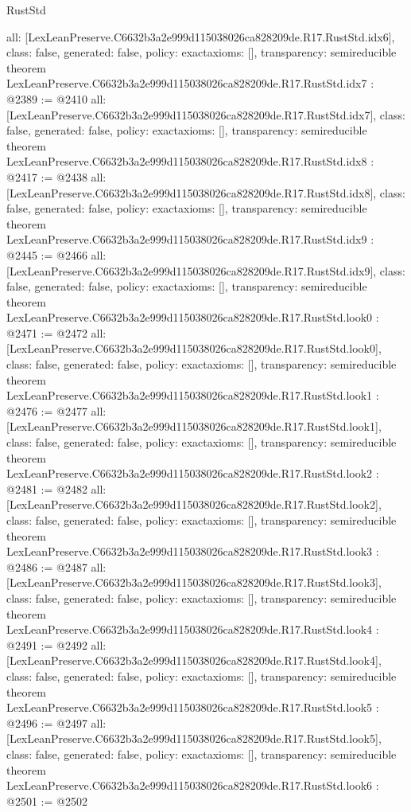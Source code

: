 \begin{lexlean}{RustStd}
\begin{coremodule}
{  all: [LexLeanPreserve.C6632b3a2e999d115038026ca828209de.R17.RustStd.idx6],
  class: false,
  generated: false,
  policy: exact{axioms: []},
  transparency: semireducible
}
theorem LexLeanPreserve.C6632b3a2e999d115038026ca828209de.R17.RustStd.idx7 : @2389 := @2410 {
  all: [LexLeanPreserve.C6632b3a2e999d115038026ca828209de.R17.RustStd.idx7],
  class: false,
  generated: false,
  policy: exact{axioms: []},
  transparency: semireducible
}
theorem LexLeanPreserve.C6632b3a2e999d115038026ca828209de.R17.RustStd.idx8 : @2417 := @2438 {
  all: [LexLeanPreserve.C6632b3a2e999d115038026ca828209de.R17.RustStd.idx8],
  class: false,
  generated: false,
  policy: exact{axioms: []},
  transparency: semireducible
}
theorem LexLeanPreserve.C6632b3a2e999d115038026ca828209de.R17.RustStd.idx9 : @2445 := @2466 {
  all: [LexLeanPreserve.C6632b3a2e999d115038026ca828209de.R17.RustStd.idx9],
  class: false,
  generated: false,
  policy: exact{axioms: []},
  transparency: semireducible
}
theorem LexLeanPreserve.C6632b3a2e999d115038026ca828209de.R17.RustStd.look0 : @2471 := @2472 {
  all: [LexLeanPreserve.C6632b3a2e999d115038026ca828209de.R17.RustStd.look0],
  class: false,
  generated: false,
  policy: exact{axioms: []},
  transparency: semireducible
}
theorem LexLeanPreserve.C6632b3a2e999d115038026ca828209de.R17.RustStd.look1 : @2476 := @2477 {
  all: [LexLeanPreserve.C6632b3a2e999d115038026ca828209de.R17.RustStd.look1],
  class: false,
  generated: false,
  policy: exact{axioms: []},
  transparency: semireducible
}
theorem LexLeanPreserve.C6632b3a2e999d115038026ca828209de.R17.RustStd.look2 : @2481 := @2482 {
  all: [LexLeanPreserve.C6632b3a2e999d115038026ca828209de.R17.RustStd.look2],
  class: false,
  generated: false,
  policy: exact{axioms: []},
  transparency: semireducible
}
theorem LexLeanPreserve.C6632b3a2e999d115038026ca828209de.R17.RustStd.look3 : @2486 := @2487 {
  all: [LexLeanPreserve.C6632b3a2e999d115038026ca828209de.R17.RustStd.look3],
  class: false,
  generated: false,
  policy: exact{axioms: []},
  transparency: semireducible
}
theorem LexLeanPreserve.C6632b3a2e999d115038026ca828209de.R17.RustStd.look4 : @2491 := @2492 {
  all: [LexLeanPreserve.C6632b3a2e999d115038026ca828209de.R17.RustStd.look4],
  class: false,
  generated: false,
  policy: exact{axioms: []},
  transparency: semireducible
}
theorem LexLeanPreserve.C6632b3a2e999d115038026ca828209de.R17.RustStd.look5 : @2496 := @2497 {
  all: [LexLeanPreserve.C6632b3a2e999d115038026ca828209de.R17.RustStd.look5],
  class: false,
  generated: false,
  policy: exact{axioms: []},
  transparency: semireducible
}
theorem LexLeanPreserve.C6632b3a2e999d115038026ca828209de.R17.RustStd.look6 : @2501 := @2502 {
}
\end{coremodule}
\end{lexlean}
